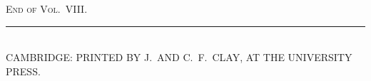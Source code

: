 \documentclass[11pt,a4paper]{book}
\begin{document}
\vspace{3em}
\begin{center}
\textsc{End of Vol.\ VIII.}
\end{center}

\vfill
\begin{center}
\rule{0.4\linewidth}{0.3pt}\\[0.5em]
\footnotesize CAMBRIDGE: PRINTED BY J.\ AND C.\ F.\ CLAY, AT THE UNIVERSITY PRESS.
\end{center}

\clearpage
\end{document}
